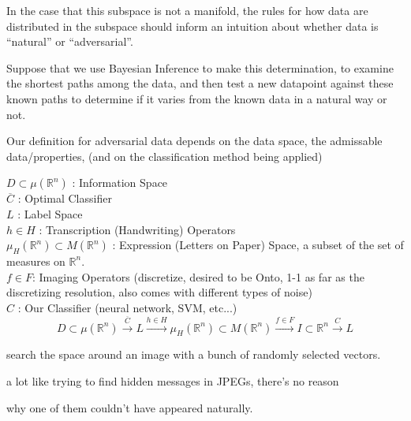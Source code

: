 \documentclass[10pt]{extarticle}\usepackage[letterpaper]{geometry}
\newcommand{\R}{\mathbb{R}}
\begin{document}
In the case that this subspace is not a manifold, the rules for how
data are distributed in the subspace should inform an intuition about
whether data is ``natural'' or ``adversarial''.\\
\vspace{.3cm}

Suppose that we use Bayesian Inference to make this determination, to
examine the shortest paths among the data, and then test a new
datapoint against these known paths to determine if it varies from the
known data in a natural way or not.\\

\vspace{.3cm}

Our definition for adversarial data depends on the data space, the
admissable data/properties, (and on the classification method being
applied)


$D\subset \mu(\R^n)$ : Information Space\\
$\overline C$ : Optimal Classifier\\
$L$ : Label Space\\
$h \in H$ : Transcription (Handwriting) Operators\\
$\mu_H(\R^n) \subset M(\R^n)$ : Expression (Letters on Paper) Space, a subset of the set of measures on $\R^n$. \\
$f \in F$: Imaging Operators (discretize, desired to be Onto, 1-1 as far as the discretizing resolution, also comes with different types of noise)\\
$C$ : Our Classifier (neural network, SVM, etc...)\\

\[ D\subset \mu(\R^n)  \xrightarrow{\overline C} L \xrightarrow{h \in H} \mu_H(\R^n) \subset M(\R^n) \xrightarrow{f \in F} I \subset \R^n \xrightarrow{C} L\]


\vspace{.3cm}

search the space around an image with a bunch of randomly selected
vectors. 

a lot like trying to find hidden messages in JPEGs, there's no reason

why one of them couldn't have appeared naturally. 
\end{document}
